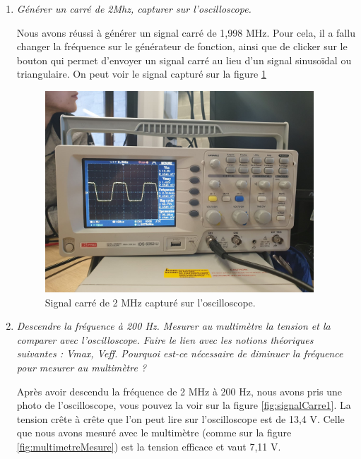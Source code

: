 \documentclass[a4paper]{article}
\begin{document}
\begin{enumerate}
\item \textit{Générer un carré de 2Mhz, capturer sur l'oscilloscope.}

Nous avons réussi à générer un signal carré de 1,998 MHz. Pour cela, il a fallu changer la fréquence sur le générateur de fonction, ainsi que de clicker sur le bouton qui permet d'envoyer un signal carré au lieu d'un signal sinusoïdal ou triangulaire. On peut voir le signal capturé sur la figure \ref{fig:signalCarre2}

\begin{figure}%
  \centering
  \includegraphics[width=0.95\textwidth]{signal-carre02.jpg}
  \caption{Signal carré de 2 MHz capturé sur l'oscilloscope.}
  \label{fig:signalCarre2}
\end{figure}





\item \textit{Descendre la fréquence à 200 Hz. Mesurer au multimètre la tension et la comparer avec l'oscilloscope. Faire le lien avec les notions théoriques suivantes : Vmax, Veff. Pourquoi est-ce nécessaire de diminuer la fréquence pour mesurer au multimètre ?}

  Après avoir descendu la fréquence de 2 MHz à 200 Hz, nous avons pris une photo de l'oscilloscope, vous pouvez la voir sur la figure \ref{fig:signalCarre1}. La tension crête à crête que l'on peut lire sur l'oscilloscope est de 13,4 V. Celle que nous avons mesuré avec le multimètre (comme sur la figure \ref{fig:multimetreMesure}) est la tension efficace et vaut 7,11 V.


\end{enumerate}
\end{document}
